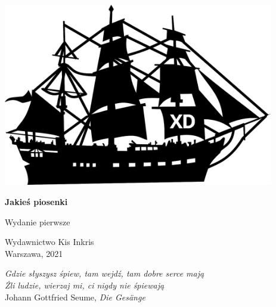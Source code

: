 \documentclass[11pt, twoside]{book}
\begin{document}
\begin{titlepage}
    \begin{center}
        \vspace*{5cm}
        
        \includegraphics[height=8cm]{images/front-obrazek.png}

        \vspace{1.5cm}

        \Huge\textbf{Jakieś piosenki}
        
        \vspace{0.5cm}
        
        \large Wydanie pierwsze
        
        \vfill

        \large
        Wydawnictwo Kis Inkris \\
        Warszawa, 2021

        \vspace{0.8cm}

        \footnotesize
        \textit{%
        Gdzie słyszysz śpiew, tam wejdź, tam dobre serce mają \\
        Żli ludzie, wierzaj mi, ci nigdy nie śpiewają} \medskip \\
        Johann Gottfried Seume, \textit{Die Gesänge}

    \end{center}
\end{titlepage}
\end{document}
